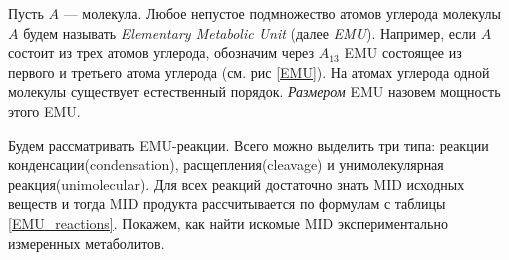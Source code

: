 \documentclass[14pt, a4paper]{extreport}
\begin{document}
Пусть $A$ --- молекула. Любое непустое подмножество атомов углерода молекулы $A$ будем называть \emph{Elementary Metabolic Unit} (далее \emph{EMU}). Например, если $A$ состоит из трех атомов углерода, обозначим через $A_{13}$ EMU состоящее из первого и третьего атома углерода (см. рис \ref{EMU}). На атомах углерода одной молекулы существует естественный порядок. \emph{Размером} EMU назовем мощность этого EMU.

Будем рассматривать EMU-реакции. Всего можно выделить три типа: реакции конденсации(condensation), расщепления(cleavage) и унимолекулярная реакция(unimolecular). Для всех реакций достаточно знать MID исходных веществ и тогда MID продукта рассчитывается по формулам с таблицы \ref{EMU_reactions}. Покажем, как найти искомые MID экспериментально измеренных метаболитов.

\clearpage
\end{document}
